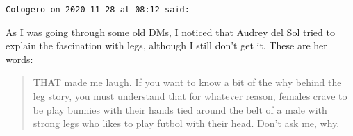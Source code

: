 \begin{footnotesize}
\begin{sffamily}
\hfill

\texttt{Cologero on 2020-11-28 at 08:12 said:}

As I was going through some old DMs, I noticed that Audrey del Sol tried to explain the fascination with legs, although I still don't get it. These are her words:

\begin{quote}\footnotesize
THAT made me laugh. If you want to know a bit of the why behind the leg story, you must understand that for whatever reason, females crave to be play bunnies with their hands tied around the belt of a male with strong legs who likes to play futbol with their head. Don't ask me, why.
\end{quote}


\hfill

\end{sffamily}
\end{footnotesize}

